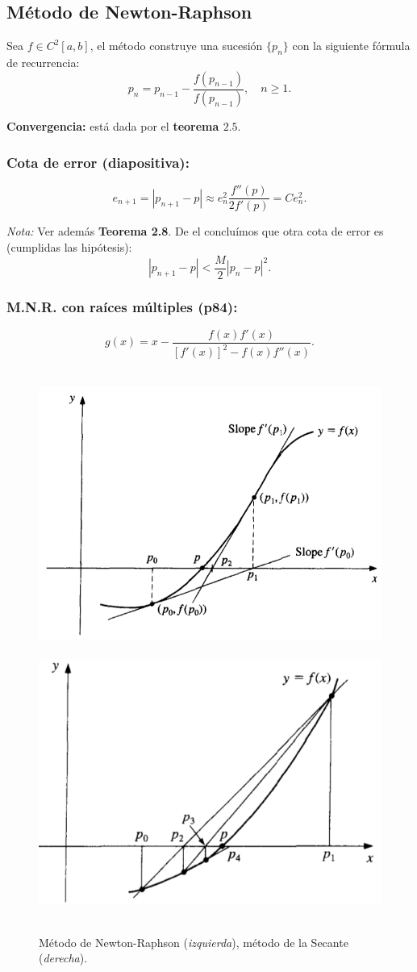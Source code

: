 \documentclass[10pt,a4paper]{article}
\begin{document}
\subsection{Método de Newton-Raphson}

Sea $f \in C^2 [a,b]$, el método construye una sucesión $\{p_n\}$ con la siguiente fórmula de recurrencia:
\[p_n = p_{n-1} - \frac{f(p_{n-1})}{f(p_{n-1})},\quad n\geq 1.\]

\textbf{Convergencia:} está dada por el \textbf{teorema $2.5$}.

\subsubsection{Cota de error (diapositiva):}
\[e_{n+1}=|p_{n+1}-p| \approx e_n^2\frac{f''(p)}{2f'(p)} = C e_n^2.\]

\textit{Nota:} Ver además \textbf{Teorema 2.8}. De el concluímos que otra cota de error es (cumplidas las hipótesis):
\[|p_{n+1}-p| < \frac{M}{2}|p_n - p|^2.\]

\subsubsection{M.N.R. con raíces múltiples (p84):}
\[g(x)=x-\frac{f(x) f'(x)}{[f'(x)]^2 -f(x) f''(x)}.\]

\begin{figure}[h!]
  \label{fig:newton}
  \caption{Método de Newton-Raphson (\textit{izquierda}), método de la Secante (\textit{derecha}).}
  \centering
  \hbox{
  \includegraphics[width=0.45\textwidth-\fboxrule-\fboxrule]{img/newton.png}
  \hspace{0.04\textwidth-\fboxrule-\fboxrule}
   \includegraphics[width=0.45\textwidth-\fboxrule-\fboxrule]{img/secant.png}
    }
\end{figure}	
\end{document}
